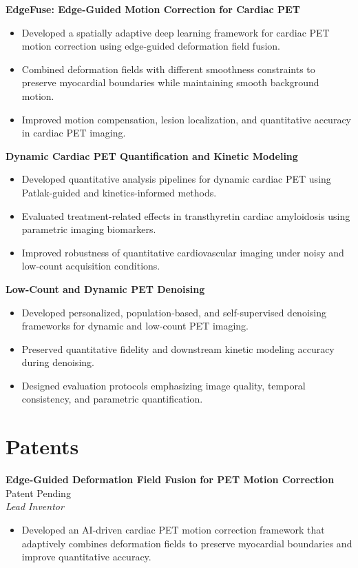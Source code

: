 \textbf{EdgeFuse: Edge-Guided Motion Correction for Cardiac PET}
\begin{itemize}[leftmargin=*]
\item Developed a spatially adaptive deep learning framework for cardiac PET motion correction using edge-guided deformation field fusion.
\item Combined deformation fields with different smoothness constraints to preserve myocardial boundaries while maintaining smooth background motion.
\item Improved motion compensation, lesion localization, and quantitative accuracy in cardiac PET imaging.
\end{itemize}

\textbf{Dynamic Cardiac PET Quantification and Kinetic Modeling}
\begin{itemize}[leftmargin=*]
\item Developed quantitative analysis pipelines for dynamic cardiac PET using Patlak-guided and kinetics-informed methods.
\item Evaluated treatment-related effects in transthyretin cardiac amyloidosis using parametric imaging biomarkers.
\item Improved robustness of quantitative cardiovascular imaging under noisy and low-count acquisition conditions.
\end{itemize}

\textbf{Low-Count and Dynamic PET Denoising}
\begin{itemize}[leftmargin=*]
\item Developed personalized, population-based, and self-supervised denoising frameworks for dynamic and low-count PET imaging.
\item Preserved quantitative fidelity and downstream kinetic modeling accuracy during denoising.
\item Designed evaluation protocols emphasizing image quality, temporal consistency, and parametric quantification.
\end{itemize}

\section{Patents}
\textbf{Edge-Guided Deformation Field Fusion for PET Motion Correction} \hfill Patent Pending \\
\textit{Lead Inventor}
\begin{itemize}[leftmargin=*]
\item Developed an AI-driven cardiac PET motion correction framework that adaptively combines deformation fields to preserve myocardial boundaries and improve quantitative accuracy.
\end{itemize}

